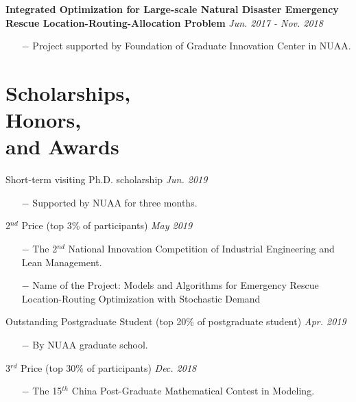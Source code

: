 \documentclass[margin]{res}
\begin{document}
\begin{resume}
\textbf{{Integrated Optimization for Large-scale Natural Disaster Emergency Rescue Location-Routing-Allocation Problem}} \hspace{65pt} {\it Jun. 2017 - Nov. 2018}
\begin{itemize} \itemsep -2pt  %
\item[\(-\)] Project supported by {Foundation of Graduate Innovation Center in NUAA}.
\end{itemize}


\vspace{-.8em}
\section{\sc Scholarships, \\Honors, \\and Awards}


{Short-term visiting Ph.D. scholarship} \hfill {\it Jun. 2019}
\begin{itemize} \itemsep -2pt  %
\item[\(-\)] Supported by NUAA for three months.
\end{itemize}
\vspace{-.8em}

{2\(^{nd}\) Price} (top 3\% of participants)   \hfill {\it May 2019}
\begin{itemize} \itemsep -2pt  %
\item[\(-\)] The 2\(^{nd}\) National Innovation Competition of Industrial Engineering and Lean Management.
\item[\(-\)] Name of the Project: {Models and Algorithms for Emergency Rescue Location-Routing Optimization with Stochastic Demand}
\end{itemize}
\vspace{-.8em}

{Outstanding Postgraduate Student} (top 20\% of postgraduate student) \hfill {\it Apr. 2019}
\begin{itemize} \itemsep -2pt  %
\item[\(-\)] By NUAA graduate school.
\end{itemize}
\vspace{-.8em}

{3\(^{rd}\) Price} (top 30\% of participants)   \hfill {\it Dec. 2018}
\begin{itemize} \itemsep -2pt  %
\item[\(-\)] The 15\(^{th}\) China Post-Graduate Mathematical Contest in Modeling.
\end{itemize}
\vspace{-.8em}


\end{resume}
\end{document}
